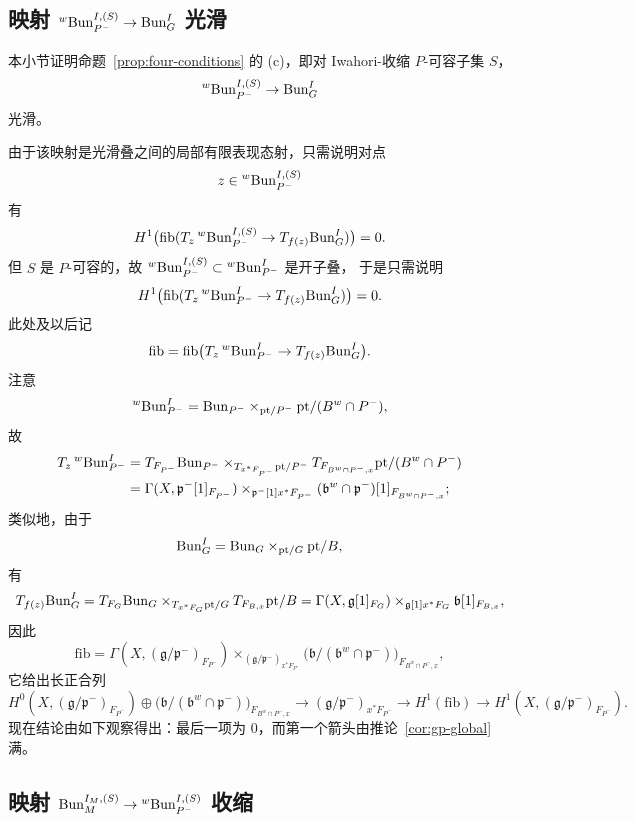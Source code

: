 \subsection{\texorpdfstring{映射 ${}^{w}\mathrm{Bun}^{I,(S)}_{P^-}\to \mathrm{Bun}^I_G$ 光滑}{映射 wI,(S)P- IG 光滑}}
\label{sec:four-c}

本小节证明命题~\ref{prop:four-conditions} 的 (c)，即对 Iwahori-收缩 $P$-可容子集 $S$，
\[
{}^{w}\mathrm{Bun}^{I,(S)}_{P^-}\to \mathrm{Bun}^I_G
\]
光滑。

由于该映射是光滑叠之间的局部有限表现态射，只需说明对点
\[
z\in {}^{w}\mathrm{Bun}^{I,(S)}_{P^-}
\]
有
\[
H^1\bigl(\mathrm{fib}(T_z\,{}^{w}\mathrm{Bun}^{I,(S)}_{P^-}\to T_{f(z)}\mathrm{Bun}^I_G)\bigr)=0 .
\]
但 $S$ 是 $P$-可容的，故 ${}^{w}\mathrm{Bun}^{I,(S)}_{P^-}\subset {}^{w}\mathrm{Bun}^I_{P^-}$ 是开子叠，
于是只需说明
\[
H^1\bigl(\mathrm{fib}(T_z\,{}^{w}\mathrm{Bun}^I_{P^-}\to T_{f(z)}\mathrm{Bun}^I_G)\bigr)=0 .
\]
此处及以后记
\[
\mathrm{fib}=\mathrm{fib}\bigl(T_z\,{}^{w}\mathrm{Bun}^I_{P^-}\to T_{f(z)}\mathrm{Bun}^I_G\bigr).
\]
注意
\[
{}^{w}\mathrm{Bun}^I_{P^-}
=\mathrm{Bun}_{P^-}\times_{\mathrm{pt}/P^-}\mathrm{pt}/(B^w\cap P^-),
\]
故
\begin{align}
T_z\,{}^{w}\mathrm{Bun}^I_{P^-}
&=T_{F_{P^-}}\mathrm{Bun}_{P^-}\times_{T_{x^*F_{P^-}}\mathrm{pt}/P^-}
T_{F_{B^w\cap P^-,x}}\mathrm{pt}/(B^w\cap P^-)\label{eq:2.3.4}\\
&=\Gamma(X,\mathfrak{p}^-[1]_{F_{P^-}})\times_{\mathfrak{p}^-[1]x^*F_{P^-}}
(\mathfrak{b}^w\cap \mathfrak{p}^-)[1]_{F_{B^w\cap P^-,x}};\label{eq:2.3.5}
\end{align}
类似地，由于
\[
\mathrm{Bun}^I_G=\mathrm{Bun}_G\times_{\mathrm{pt}/G}\mathrm{pt}/B,
\]
有
\[
T_{f(z)}\mathrm{Bun}^I_G
=T_{F_G}\mathrm{Bun}_G\times_{T_{x^*F_G}\mathrm{pt}/G}T_{F_{B,x}}\mathrm{pt}/B
=\Gamma(X,\mathfrak{g}[1]_{F_G})\times_{\mathfrak{g}[1]x^*F_G}\mathfrak{b}[1]_{F_{B,x}},
\]
因此
\[
\mathrm{fib}
=\Gamma(X,(\mathfrak{g}/\mathfrak{p}^-)_{F_{P^-}})
\times_{(\mathfrak{g}/\mathfrak{p}^-)_{x^*F_{P^-}}}
\bigl(\mathfrak{b}/(\mathfrak{b}^w\cap \mathfrak{p}^-)\bigr)_{F_{B^w\cap P^-,x}},
\]
它给出长正合列
\[
H^0(X,(\mathfrak{g}/\mathfrak{p}^-)_{F_{P^-}})\oplus
\bigl(\mathfrak{b}/(\mathfrak{b}^w\cap\mathfrak{p}^-)\bigr)_{F_{B^w\cap P^-,x}}
\to (\mathfrak{g}/\mathfrak{p}^-)_{x^*F_{P^-}}\to H^1(\mathrm{fib})
\to H^1(X,(\mathfrak{g}/\mathfrak{p}^-)_{F_{P^-}}).
\]
现在结论由如下观察得出：最后一项为 $0$，而第一个箭头由推论~\ref{cor:gp-global} 满。

\subsection{\texorpdfstring{映射 $\mathrm{Bun}^{I_M,(S)}_M\to {}^{w}\mathrm{Bun}^{I,(S)}_{P^-}$ 收缩}{映射 IM,(S)M wI,(S)P- 收缩}}
\label{sec:four-d}

